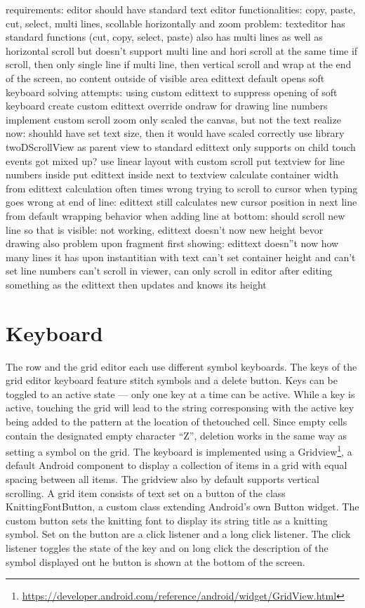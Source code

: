 requirements: 
	editor should have standard text editor functionalities: copy, paste, cut, select, multi lines, scollable horizontally and zoom
problem:
	texteditor has standard functions (cut, copy, select, paste) 
	also has multi lines as well as horizontal scroll
	but doesn't support multi line and hori scroll at the same time
	if scroll, then only single line
	if multi line, then vertical scroll and wrap at the end of the screen, no content outside of visible area
	edittext default opens soft keyboard
solving attempts:
	using custom edittext to suppress opening of soft keyboard  
	create custom edittext 
		override ondraw for drawing line numbers
		implement custom scroll
		zoom only scaled the canvas, but not the text
		realize now: shouhld have set text size, then it would have scaled correctly
	use library twoDScrollView as parent view to standard edittext
		only supports on child
		touch events got mixed up?
	use linear layout with custom scroll
		put textview for line numbers inside
		put edittext inside next to textview
		calculate container width from edittext
		calculation often times wrong
		trying to scroll to cursor when typing goes wrong at end of line: edittext still calculates new cursor position in next line from default wrapping behavior
		when adding line at bottom: should scroll new line so that is visible: not working, edittext doesn't now new height bevor drawing
		also problem upon fragment first showing: edittext doesn''t now how many lines it has upon instantitian with text 
		can't set container height and can't set line numbers
		can't scroll in viewer, can only scroll in editor after editing something as the edittext then updates and knows its height

\section{Keyboard}
The row and the grid editor each use different symbol keyboards. The keys of the grid editor keyboard feature stitch symbols and a delete button. Keys can be toggled to an active state --- only one key at a time can be active. While a key is active, touching the grid will lead to the string corresponsing with the active key being added to the pattern at the location of thetouched cell. Since empty cells contain the designated empty character ``Z'', deletion works in the same way as setting a symbol on the grid. The keyboard is implemented using a Gridview\footnote{\url{https://developer.android.com/reference/android/widget/GridView.html}}, a default Android component to display a collection of items in a grid with equal spacing between all items. The gridview also by default supports vertical scrolling. A grid item consists of text set on a button of the class KnittingFontButton, a custom class extending Android’s own Button widget. The custom button sets the knitting font to display its string title as a knitting symbol. Set on the button are a click listener and a long click listener. The click listener toggles the state of the key and on long click the description of the symbol displayed ont he button is shown at the bottom of the screen.

